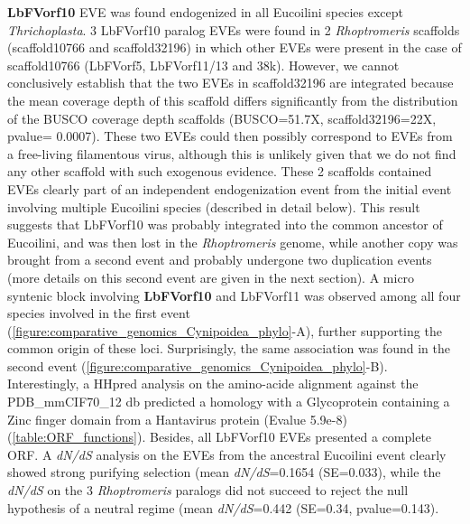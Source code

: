 \textbf{LbFVorf10} EVE was found endogenized in all Eucoilini species except \textit{Thrichoplasta}. 3 LbFVorf10 paralog EVEs were found in 2 \textit{Rhoptromeris} scaffolds (scaffold10766 and scaffold32196) in which other EVEs were present in the case of scaffold10766 (LbFVorf5, LbFVorf11/13 and 38k). However, we cannot conclusively establish that the two EVEs in scaffold32196 are integrated because the mean coverage depth of this scaffold differs significantly from the distribution of the BUSCO coverage depth scaffolds (BUSCO=51.7X, scaffold32196=22X, pvalue= 0.0007). These two EVEs could then possibly correspond to EVEs from a free-living filamentous virus, although this is unlikely given that we do not find any other scaffold with such exogenous evidence. These 2 scaffolds contained EVEs clearly part of an independent endogenization event from the initial event involving multiple Eucoilini species (described in detail below). This result suggests that LbFVorf10  was probably integrated into the common ancestor of Eucoilini, and was then lost in the \textit{Rhoptromeris} genome, while another copy was brought from a second event and probably undergone two duplication events (more details on this second event are given in the next section). A micro syntenic block involving \textbf{LbFVorf10} and LbFVorf11 was observed among  all four species involved in the first event (\figurename{\ref{figure:comparative_genomics_Cynipoidea_phylo}}-A), further supporting the common origin of these loci. Surprisingly, the same association was found in the second event (\figurename{\ref{figure:comparative_genomics_Cynipoidea_phylo}}-B).
Interestingly, a HHpred analysis on the amino-acide alignment against the PDB\_mmCIF70\_12 db predicted a homology with a Glycoprotein containing a Zinc finger domain from a Hantavirus protein (Evalue 5.9e-8) (\figurename{\ref{table:ORF_functions}}). Besides, all LbFVorf10 EVEs presented a complete ORF. A \textit{dN/dS} analysis on the EVEs from the ancestral Eucoilini event clearly showed strong purifying selection (mean \textit{dN/dS}=0.1654 (SE=0.033), while the \textit{dN/dS} on the 3 \textit{Rhoptromeris} paralogs did not succeed to reject the null hypothesis of a neutral regime (mean \textit{dN/dS}=0.442 (SE=0.34, pvalue=0.143).\\


